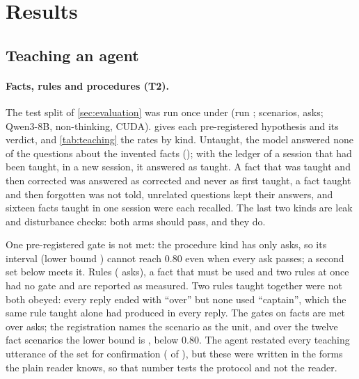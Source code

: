 
\section{Results}\label{sec:results}

\subsection{Teaching an agent}

\paragraph{Facts, rules and procedures (T2).}
The test split of \cref{sec:evaluation} was run once under  (run ; \TeachScenarios{} scenarios, \TeachAsks{} asks; Qwen3-8B, non-thinking, CUDA).  gives each pre-registered hypothesis and its verdict, and \cref{tab:teaching} the
rates by kind. Untaught, the model answered none of the questions about the invented facts (\TeachFactUntaught{}); with the ledger of a session that had been taught, in a new session, it answered \TeachFactTaught{} as taught. A fact that was taught and then corrected was answered as
corrected and never as first taught, a fact taught and then forgotten was not told, unrelated questions kept their answers, and sixteen facts taught in one session were each recalled. The last two kinds are leak and disturbance checks: both arms should pass, and they do.

One pre-registered gate is not met: the procedure kind has only \TeachProcedureAsks{} asks, so its interval (lower bound \TeachProcedureLow{}) cannot reach 0.80 even when every ask passes; a second set below meets it. Rules (\TeachRulesAsks{} asks), a fact that must be used and two rules at once had no gate and are reported as measured. Two rules
taught together were not both obeyed: every reply ended with ``over'' but none used ``captain'', which the same rule taught alone had produced in every reply. The gates on facts are met over asks; the registration names the scenario as the unit, and over the twelve fact scenarios the lower bound is \TeachFactScenarioLow{}, below 0.80. The agent restated every teaching utterance of the set for confirmation
(\TeachUnderstood{} of \TeachTeachings{}), but these were written in the forms the plain reader knows, so that number tests the protocol and not the reader.

